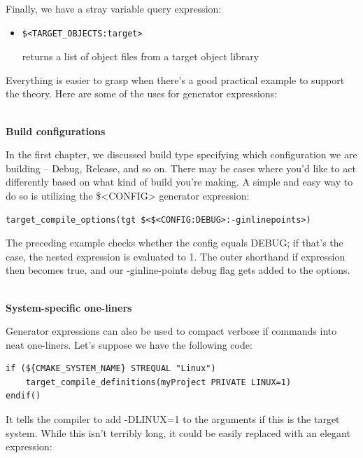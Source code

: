 Finally, we have a stray variable query expression:

\begin{itemize}
\item 
\begin{lstlisting}[style=styleCMake]
$<TARGET_OBJECTS:target> 
\end{lstlisting}

returns a list of object files from a target object library
\end{itemize}


Everything is easier to grasp when there's a good practical example to support the theory. Here are some of the uses for generator expressions:

\hspace*{\fill} \\ %
\noindent
\textbf{Build configurations}

In the first chapter, we discussed build type specifying which configuration we are building – Debug, Release, and so on. There may be cases where you'd like to act differently based on what kind of build you're making. A simple and easy way to do so is utilizing the \$<CONFIG> generator expression:

\begin{lstlisting}[style=styleCMake]
target_compile_options(tgt $<$<CONFIG:DEBUG>:-ginlinepoints>)
\end{lstlisting}

The preceding example checks whether the config equals DEBUG; if that's the case, the nested expression is evaluated to 1. The outer shorthand if expression then becomes true, and our -ginline-points debug flag gets added to the options.

\hspace*{\fill} \\ %
\noindent
\textbf{System-specific one-liners}

Generator expressions can also be used to compact verbose if commands into neat one-liners. Let's suppose we have the following code:

\begin{lstlisting}[style=styleCMake]
if (${CMAKE_SYSTEM_NAME} STREQUAL "Linux")
	target_compile_definitions(myProject PRIVATE LINUX=1)
endif()
\end{lstlisting}

It tells the compiler to add -DLINUX=1 to the arguments if this is the target system. While this isn't terribly long, it could be easily replaced with an elegant expression:

